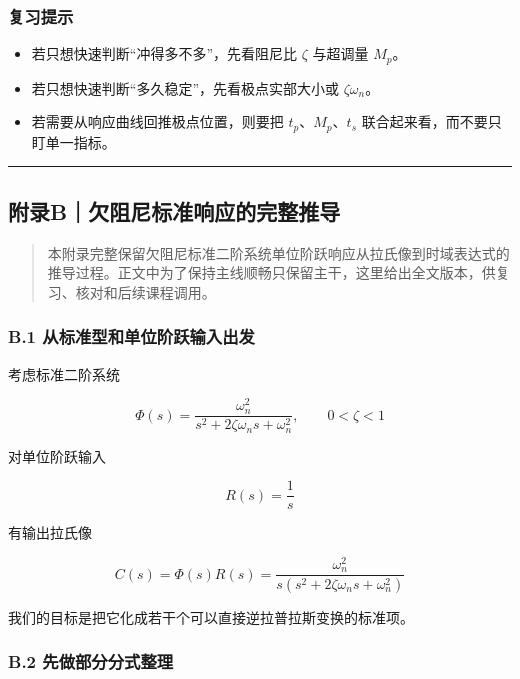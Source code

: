 \documentclass[
  11pt]{article}
\providecommand{\tightlist}{%
  \setlength{\itemsep}{0pt}\setlength{\parskip}{0pt}}
\begin{document}
\subsubsection{复习提示}\label{ux590dux4e60ux63d0ux793a}

\begin{itemize}
\tightlist
\item
  若只想快速判断``冲得多不多''，先看阻尼比 \(\zeta\) 与超调量 \(M_p\)。
\item
  若只想快速判断``多久稳定''，先看极点实部大小或 \(\zeta\omega_n\)。
\item
  若需要从响应曲线回推极点位置，则要把 \(t_p\)、\(M_p\)、\(t_s\)
  联合起来看，而不要只盯单一指标。
\end{itemize}

\begin{center}\rule{0.5\linewidth}{0.5pt}\end{center}

\subsection{附录B｜欠阻尼标准响应的完整推导}\label{ux9644ux5f55bux6b20ux963bux5c3cux6807ux51c6ux54cdux5e94ux7684ux5b8cux6574ux63a8ux5bfc}

\begin{quote}
本附录完整保留欠阻尼标准二阶系统单位阶跃响应从拉氏像到时域表达式的推导过程。正文中为了保持主线顺畅只保留主干，这里给出全文版本，供复习、核对和后续课程调用。
\end{quote}

\subsubsection{B.1
从标准型和单位阶跃输入出发}\label{b.1-ux4eceux6807ux51c6ux578bux548cux5355ux4f4dux9636ux8dc3ux8f93ux5165ux51faux53d1}

考虑标准二阶系统

\[
\Phi(s)=\frac{\omega_n^2}{s^2+2\zeta\omega_n s+\omega_n^2}, \qquad 0<\zeta<1
\]

对单位阶跃输入

\[
R(s)=\frac{1}{s}
\]

有输出拉氏像

\[
C(s)=\Phi(s)R(s)=\frac{\omega_n^2}{s\left(s^2+2\zeta\omega_n s+\omega_n^2\right)}
\]

我们的目标是把它化成若干个可以直接逆拉普拉斯变换的标准项。

\subsubsection{B.2
先做部分分式整理}\label{b.2-ux5148ux505aux90e8ux5206ux5206ux5f0fux6574ux7406}
\end{document}
